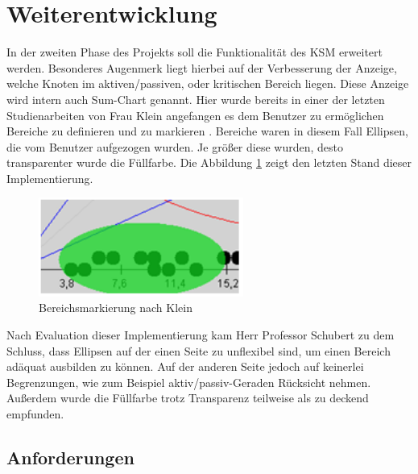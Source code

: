 \section{Weiterentwicklung}

In der zweiten Phase des Projekts soll die Funktionalität des KSM erweitert werden. Besonderes Augenmerk liegt hierbei auf der Verbesserung der Anzeige, welche Knoten im aktiven/passiven, oder kritischen Bereich liegen. Diese Anzeige wird intern auch Sum-Chart genannt. Hier wurde bereits in einer der letzten Studienarbeiten von Frau Klein angefangen es dem Benutzer zu ermöglichen Bereiche zu definieren und zu markieren \cite{bib:klein}. Bereiche waren in diesem Fall Ellipsen, die vom Benutzer aufgezogen wurden. Je größer diese wurden, desto transparenter wurde die Füllfarbe. Die Abbildung \ref{ellipse} zeigt den letzten Stand dieser Implementierung.
\begin{figure}[h]
	\centering
	\includegraphics[width=0.6\textwidth]{pictures/ellipse.png}
	\caption{Bereichsmarkierung nach Klein \cite{bib:klein}}
	\label{ellipse}
\end{figure}

Nach Evaluation dieser Implementierung kam Herr Professor Schubert zu dem Schluss, dass Ellipsen auf der einen Seite zu unflexibel sind, um einen Bereich adäquat ausbilden zu können. Auf der anderen Seite jedoch auf keinerlei Begrenzungen, wie zum Beispiel aktiv/passiv-Geraden  Rücksicht nehmen. Außerdem wurde die Füllfarbe trotz Transparenz teilweise als zu deckend empfunden.

\subsection{Anforderungen}


